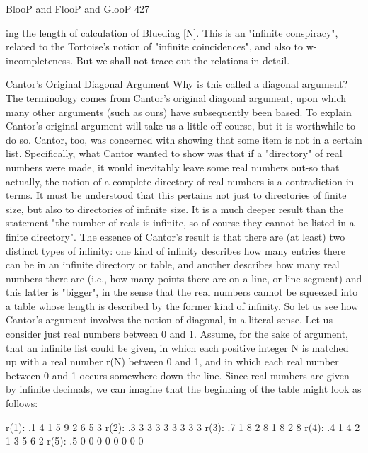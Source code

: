 BlooP and FlooP and GlooP                                                                427

ing the length of calculation of Bluediag [N]. This is an "infinite conspiracy", related to
the Tortoise's notion of "infinite coincidences", and also to w-incompleteness. But we
shall not trace out the relations in detail.

                      Cantor's Original Diagonal Argument
Why is this called a diagonal argument? The terminology comes from Cantor's original
diagonal argument, upon which many other arguments (such as ours) have subsequently
been based. To explain Cantor's original argument will take us a little off course, but it is
worthwhile to do so. Cantor, too, was concerned with showing that some item is not in a
certain list. Specifically, what Cantor wanted to show was that if a "directory" of real
numbers were made, it would inevitably leave some real numbers out-so that actually, the
notion of a complete directory of real numbers is a contradiction in terms.
        It must be understood that this pertains not just to directories of finite size, but
also to directories of infinite size. It is a much deeper result than the statement "the
number of reals is infinite, so of course they cannot be listed in a finite directory". The
essence of Cantor's result is that there are (at least) two distinct types of infinity: one kind
of infinity describes how many entries there can be in an infinite directory or table, and
another describes how many real numbers there are (i.e., how many points there are on a
line, or line segment)-and this latter is "bigger", in the sense that the real numbers cannot
be squeezed into a table whose length is described by the former kind of infinity. So let
us see how Cantor's argument involves the notion of diagonal, in a literal sense.
        Let us consider just real numbers between 0 and 1. Assume, for the sake of
argument, that an infinite list could be given, in which each positive integer N is matched
up with a real number r(N) between 0 and 1, and in which each real number between 0
and 1 occurs somewhere down the line. Since real numbers are given by infinite
decimals, we can imagine that the beginning of the table might look as follows:

r(1):   .1     4       1       5       9       2       6       5       3
r(2):   .3     3       3       3       3       3       3       3       3
r(3):   .7     1       8       2       8       1       8       2       8
r(4):   .4     1       4       2       1       3       5       6       2
r(5):   .5     0       0       0       0       0       0       0       0


